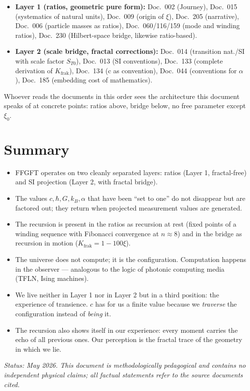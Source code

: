 \begin{itemize}\setlength\itemsep{0pt}
  \item \textbf{Layer 1 (ratios, geometric pure form):}
    Doc.~002 (Journey), Doc.~015 (systematics of natural units),
    Doc.~009 (origin of $\xi$), Doc.~205 (narrative),
    Doc.~006 (particle masses as ratios),
    Doc.~060/116/159 (mode and winding ratios),
    Doc.~230 (Hilbert-space bridge, likewise ratio-based).
  \item \textbf{Layer 2 (scale bridge, fractal corrections):}
    Doc.~014 (transition nat./SI with scale factor $S_{T0}$),
    Doc.~013 (SI conventions), Doc.~133 (complete derivation of
    $K_{\mathrm{frak}}$), Doc.~134 (c as convention),
    Doc.~044 (conventions for $\alpha$), Doc.~185 (embedding cost of mathematics).
\end{itemize}

Whoever reads the documents in this order sees the architecture this
document speaks of at concrete points: ratios above, bridge below, no
free parameter except $\xi_{0}$.

\section*{Summary}

\begin{itemize}\setlength\itemsep{2pt}
  \item FFGFT operates on two cleanly separated layers:
        ratios (Layer 1, fractal-free) and SI projection (Layer 2,
        with fractal bridge).
  \item The values $c, \hbar, G, k_B, \alpha$ that have been ``set to
        one'' do not disappear but are factored out; they return when
        projected measurement values are generated.
  \item The recursion is present in the ratios as recursion at rest
        (fixed points of a winding sequence with Fibonacci convergence
        at $n \approx 8$) and in the bridge as recursion in motion
        ($K_{\mathrm{frak}} = 1 - 100\xi$).
  \item The universe does not compute; it is the configuration.
        Computation happens in the observer --- analogous to the logic
        of photonic computing media (TFLN, Ising machines).
  \item We live neither in Layer 1 nor in Layer 2 but in a third
        position: the experience of transience. $c$ has for us a
        finite value because we \emph{traverse} the configuration
        instead of \emph{being} it.
  \item The recursion also shows itself in our experience: every
        moment carries the echo of all previous ones. Our perception
        is the fractal trace of the geometry in which we lie.
\end{itemize}

\medskip
\noindent\textit{Status: May 2026. This document is methodologically
pedagogical and contains no independent physical claims; all factual
statements refer to the source documents cited.}
